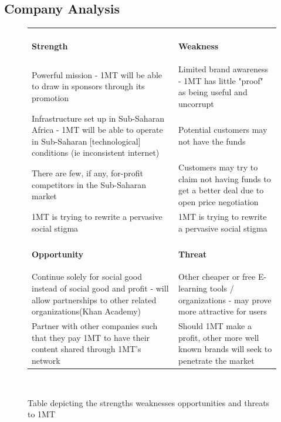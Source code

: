 \documentclass[letterpaper]{article}
\begin{document}
    \subsection{Company Analysis}
        
        \begin{figure}[h!]
            \begin{center}
                \begin{tabular}{| p{7.5cm} | p{7.5cm} |}
                    \hline
                    \\[-1em]
                    \begin{large}\textbf{Strength}\end{large} & \begin{large}\textbf{Weakness}\end{large}\\
                    \hline
                    Powerful mission - 1MT will be able to draw in sponsors through its promotion &
                        Limited brand awareness - 1MT has little "proof" as being useful and uncorrupt \\
                    Infrastructure set up in Sub-Saharan Africa - 1MT will be able to operate in Sub-Saharan [technological] conditions (ie inconsistent internet) & 
                        Potential customers may not have the funds \\
                    There are few, if any, for-profit competitors in the Sub-Saharan market &
                        Customers may try to claim not having funds to get a better deal due to open price negotiation \\
                    1MT is trying to rewrite a pervasive social stigma &
                        1MT is trying to rewrite a pervasive social stigma \\
                    \hline
                    \\[-1em]
                    \begin{large}\textbf{Opportunity}\end{large} & \begin{large}\textbf{Threat}\end{large}\\
                    \hline
                    Continue solely for social good instead of social good and profit - will allow partnerships to other related organizations(Khan Academy) &
                        Other cheaper or free E-learning tools / organizations - may prove more attractive for users \\
                    Partner with other companies such that they pay 1MT to have their content shared through 1MT's network &
                        Should 1MT make a profit, other more well known brands will seek to penetrate the market \\
                    \hline
                \end{tabular} \\
                \caption{Table depicting the strengths weaknesses opportunities and threats to 1MT}
            \end{center}
        \end{figure}
\end{document}
